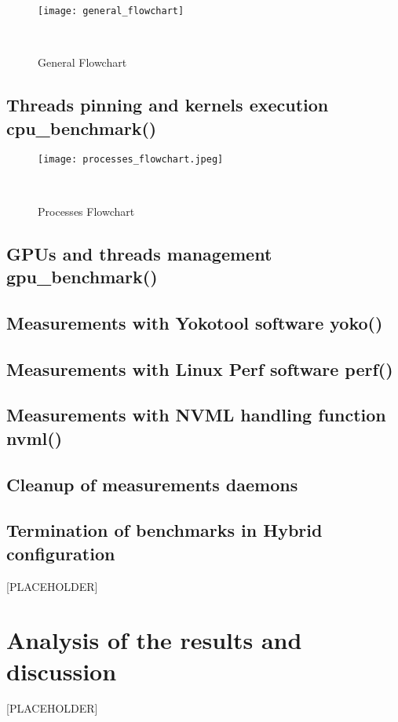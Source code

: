 \begin{figure}[hbtp]
    \centering
    \texttt{[image: general\_flowchart]}
    \caption{General Flowchart}~\label{fig:general_flowchart}
\end{figure}


\subsection{Threads pinning and kernels execution \- cpu\_benchmark()}

\begin{figure}[hbtp]
    \centering
    \texttt{[image: processes\_flowchart.jpeg]}
    \caption{Processes Flowchart}~\label{fig:processes_flowchart.jpeg}
\end{figure}


\subsection{GPUs and threads management \- gpu\_benchmark()}

\subsection{Measurements with Yokotool software \- yoko()}

\subsection{Measurements with Linux Perf software \- perf()}

\subsection{Measurements with NVML handling function \- nvml()}

\subsection{Cleanup of measurements daemons}

\subsection{Termination of benchmarks in Hybrid configuration}


[PLACEHOLDER]

\newpage

\section{Analysis of the results and discussion}



[PLACEHOLDER]
